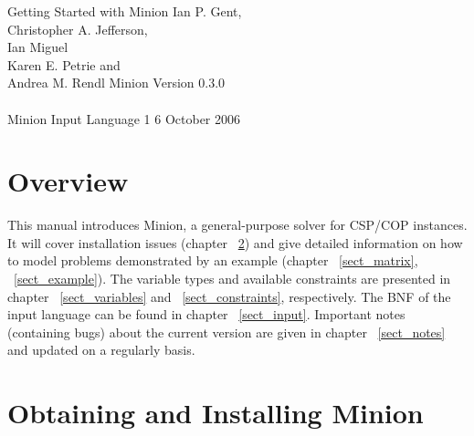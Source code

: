 \documentclass{article}
\begin{document}

\newpage

\pagestyle{empty}
\begin{center}
\vfill
{\LARGE Getting Started with {\sc Minion}}
\vfill
{\large Ian P. Gent,\\
Christopher A. Jefferson,\\
Ian Miguel\\
Karen E. Petrie and\\
Andrea M. Rendl}
\vfill
{\Large {\sc Minion} Version 0.3.0}\\
~\\
{\Large {\sc Minion} Input Language 1}
\vfill
{\large  6 October  2006}
\vfill
\end{center}

\newpage

\pagestyle{empty}
\setcounter{page}{1}
\pagestyle{plain}

\tableofcontents

\newpage
\setcounter{page}{1}
\pagestyle{headings}


\section{Overview}\label{sect_introduction}
This manual introduces {\sc Minion}, a general-purpose solver for CSP/COP instances. 
It will cover installation issues (chapter ~\ref{sect_installation})  and give detailed information on how to model problems demonstrated by an example (chapter  ~\ref{sect_matrix}, ~\ref{sect_example}). The variable types and available
constraints are presented in chapter ~\ref{sect_variables} and ~\ref{sect_constraints}, respectively. The BNF of the input language can be found in chapter ~\ref{sect_input}. Important notes (containing bugs) about the current version are given in chapter ~\ref{sect_notes} and updated on a regularly basis. 

\section{Obtaining and Installing {\sc Minion}}\label{sect_installation}
\end{document}
